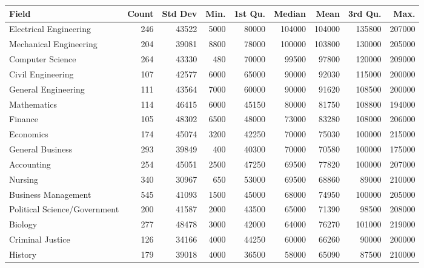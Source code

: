 \documentclass{exam}
\begin{document}
  \begin{table}[ht]
    \centering
    \begin{tabular}{lrrrrrrrr}
      \toprule
      Field                        & Count & Std Dev & Min. & 1st Qu. & Median & Mean   & 3rd Qu. & Max. \\
      \midrule
      Electrical Engineering       & 246   & 43522   & 5000 & 80000   & 104000 & 104000 & 135800  & 207000 \\
      Mechanical Engineering       & 204   & 39081   & 8800 & 78000   & 100000 & 103800 & 130000  & 205000 \\
      Computer Science             & 264   & 43330   & 480  & 70000   & 99500  & 97800  & 120000  & 209000 \\
      Civil Engineering            & 107   & 42577   & 6000 & 65000   & 90000  & 92030  & 115000  & 200000 \\
      General Engineering          & 111   & 43564   & 7000 & 60000   & 90000  & 91620  & 108500  & 200000 \\
      Mathematics                  & 114   & 46415   & 6000 & 45150   & 80000  & 81750  & 108800  & 194000 \\
      Finance                      & 105   & 48302   & 6500 & 48000   & 73000  & 83280  & 108000  & 206000 \\
      Economics                    & 174   & 45074   & 3200 & 42250   & 70000  & 75030  & 100000  & 215000 \\
      General Business             & 293   & 39849   & 400  & 40300   & 70000  & 70580  & 100000  & 175000 \\
      Accounting                   & 254   & 45051   & 2500 & 47250   & 69500  & 77820  & 100000  & 207000 \\
      Nursing                      & 340   & 30967   & 650  & 53000   & 69500  & 68860  & 89000   & 210000 \\
      Business Management          & 545   & 41093   & 1500 & 45000   & 68000  & 74950  & 100000  & 205000 \\
      Political Science/Government & 200   & 41587   & 2000 & 43500   & 65000  & 71390  & 98500   & 208000 \\
      Biology                      & 277   & 48478   & 3000 & 42000   & 64000  & 76270  & 101000  & 219000 \\
      Criminal Justice             & 126   & 34166   & 4000 & 44250   & 60000  & 66260  & 90000   & 200000 \\
      History                      & 179   & 39018   & 4000 & 36500   & 58000  & 65090  & 87500   & 210000 \\

\end{tabular}
\end{table}
\end{document}

